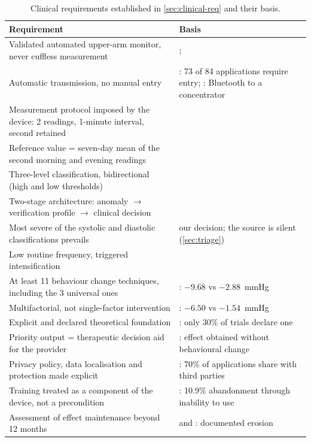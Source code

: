 \documentclass[12pt,a4paper,oneside]{report}
\begin{document}
\begin{table}[htbp]
\centering\footnotesize
\caption{Clinical requirements established in \cref{sec:clinical-req} and their basis.}\label{tab:spec13}
\begin{tabularx}{\textwidth}{@{}X >{\raggedright\arraybackslash}p{5.6cm}@{}}
\toprule
\textbf{Requirement} & \textbf{Basis} \\
\midrule
Validated automated upper-arm monitor, never cuffless measurement & \textcite{who2023hypertension}; \textcite{alessa2019} \\
Automatic transmission, no manual entry & \textcite{alessa2019}: 73 of 84 applications require entry; \textcite{mihevc2025}: Bluetooth to a concentrator \\
Measurement protocol imposed by the device: 2 readings, 1-minute interval, second retained & \textcite{mihevc2025} \\
Reference value = seven-day mean of the second morning and evening readings & \textcite{mihevc2025} \\
Three-level classification, bidirectional (high and low thresholds) & \textcite{mihevc2025} \\
Two-stage architecture: anomaly $\rightarrow$ verification profile $\rightarrow$ clinical decision & \textcite{mihevc2025} \\
Most severe of the systolic and diastolic classifications prevails & our decision; the source is silent (\cref{sec:triage}) \\
Low routine frequency, triggered intensification & \textcite{mihevc2025} \\
At least 11 behaviour change techniques, including the 3 universal ones & \textcite{zhou2024}: $-9.68$ vs $-2.88$~mmHg \\
Multifactorial, not single-factor intervention & \textcite{zhou2024}: $-6.50$ vs $-1.54$~mmHg \\
Explicit and declared theoretical foundation & \textcite{zhou2024}: only 30\% of trials declare one \\
Priority output = therapeutic decision aid for the provider & \textcite{mihevc2025}: effect obtained without behavioural change \\
Privacy policy, data localisation and protection made explicit & \textcite{alessa2019}: 70\% of applications share with third parties \\
Training treated as a component of the device, not a precondition & \textcite{mihevc2025}: 10.9\% abandonment through inability to use \\
Assessment of effect maintenance beyond 12 months & \textcite{zhou2024} and \textcite{mihevc2025}: documented erosion \\
\bottomrule
\end{tabularx}
\end{table}
\end{document}
